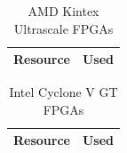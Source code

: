 %

\ifdefined\RESULTS
\ifdefined\FPGA

\ifdefined\AMD
\begin{table}[H]
\centering
\begin{tabular}{|l|r|}
\hline
\rowcolor{iob-green}
\textbf{Resource}  & \textbf{Used} \\
\hline
\hline
 
\end{tabular}
\caption{AMD Kintex Ultrascale FPGAs}
\label{tab:fpga_amd}
\end{table}
\fi

\ifdefined\INTEL
\begin{table}[H]
\centering
\begin{tabular}{|l|r|}
\hline
\rowcolor{iob-green}
\textbf{Resource}  & \textbf{Used} \\
\hline
\hline
 
\end{tabular}
\caption{Intel Cyclone V GT FPGAs}
\label{tab:fpga_intel}
\end{table}
\fi

\fi
\fi
